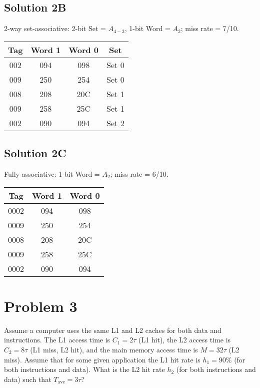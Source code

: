 \documentclass{article}
\begin{document}
\subsection*{Solution 2B} 2-way set-associative: 2-bit Set = $A_{4-3}$, 1-bit Word = $A_2$; miss rate = 7/10.

\begin{center}
\begin{tabular}{|c|c|c|c|}\hline
Tag & Word 1 & Word 0 & Set \\\hline
002 & 094 & 098 & Set 0 \\\hline
009 & 250 & 254 & Set 0 \\\hline
008 & 208 & 20C & Set 1 \\\hline
009 & 258 & 25C & Set 1 \\\hline
002 & 090 & 094 & Set 2 \\\hline
\end{tabular}
\end{center}

\subsection*{Solution 2C} Fully-associative: 1-bit Word = $A_2$; miss rate = 6/10.

\begin{center}
\begin{tabular}{|c|c|c|}
\hline
Tag & Word 1 & Word 0 \\\hline
0002 & 094 & 098 \\\hline
0009 & 250 & 254 \\\hline
0008 & 208 & 20C \\\hline
0009 & 258 & 25C \\\hline
0002 & 090 & 094 \\\hline
\end{tabular}
\end{center}
\section*{Problem 3}
Assume a computer uses the same L1 and L2 caches for both data and instructions. The L1 access time is $C_1 = 2\tau$ (L1 hit), the L2 access time is $C_2 = 8\tau$ (L1 miss, L2 hit), and the main memory access time is $M = 32\tau$ (L2 miss). Assume that for some given application the L1 hit rate is $h_1 = 90\%$ (for both instructions and data). What is the L2 hit rate $h_2$ (for both instructions and data) such that $T_{\text{ave}} = 3\tau$?
\end{document}

